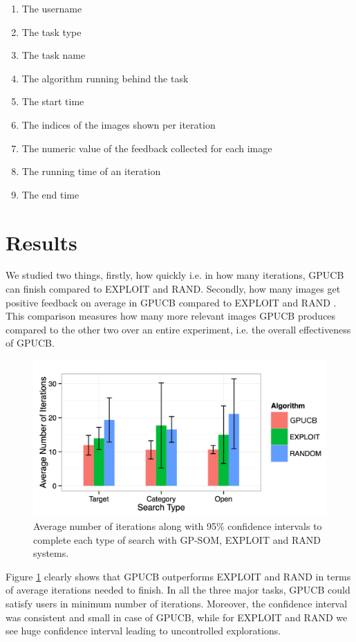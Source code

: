\documentclass[english]{tktltiki}
\begin{document}
\begin{enumerate}
	\item The username
	\item The task type
	\item The task name
	\item The algorithm running behind the task
	\item The start time
	\item The indices of the images shown per iteration
	\item The numeric value of the feedback collected for each image
	\item The running time of an iteration
	\item The end time
\end{enumerate}

\section{Results}

We studied two things, firstly, how quickly i.e. in how many iterations, GPUCB can finish compared to EXPLOIT and RAND. Secondly, how many images get positive feedback on average in GPUCB compared to EXPLOIT and RAND \cite{explor_exploit_img_ret}. This comparison measures how many more relevant images GPUCB produces compared to the other two over an entire experiment, i.e. the overall effectiveness of GPUCB.

\begin{figure}[h!]
  \centering
    \includegraphics[width=1.0\textwidth]{figures/conf_intr.png}
    \caption{Average number of iterations along with 95\% confidence intervals to complete each type of search with GP-SOM, EXPLOIT and RAND systems.}
    \label{bar_chart}
\end{figure}

Figure \ref{bar_chart} clearly shows that GPUCB outperforms EXPLOIT and RAND in terms of average iterations needed to finish. In all the three major tasks, GPUCB could satisfy users in minimum number of iterations. Moreover, the confidence interval was consistent and small in case of GPUCB, while for EXPLOIT and RAND we see huge confidence interval leading to uncontrolled explorations.
\end{document}

